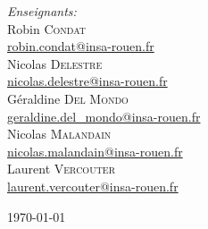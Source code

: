 \documentclass[a4paper, 12pt]{report}
\begin{document}
\begin{titlepage}
\begin{center}
\begin{minipage}{0.4\textwidth}
			\begin{flushright} \large
				\emph{Enseignants:} \\
				Robin \textsc{Condat} \\
				{\small\href{mailto:robin.condat@insa-rouen.fr}{robin.condat@insa-rouen.fr}}
				\\
				Nicolas \textsc{Delestre} \\
				{\small\href{mailto:nicolas.delestre@insa-rouen.fr}{nicolas.delestre@insa-rouen.fr}}
				\\
        		Géraldine \textsc{Del Mondo} \\
				{\small\href{mailto:geraldine.del\_mondo@insa-rouen.fr}{geraldine.del\_mondo@insa-rouen.fr}}
				\\
				Nicolas \textsc{Malandain} \\
				{\small\href{mailto:nicolas.malandain@insa-rouen.fr}{nicolas.malandain@insa-rouen.fr}}
				\\
				Laurent \textsc{Vercouter} \\
				{\small\href{mailto:laurent.vercouter@insa-rouen.fr}{laurent.vercouter@insa-rouen.fr}}
				\\
			\end{flushright}
		\end{minipage}
		\vfill
		{\large \today}
	\end{center}
\end{titlepage}

\begingroup
\titleformat{\part}[display]
    {\normalfont \bfseries\centering}{}{0pt}{\Huge}
\titlespacing*{\part}{0pt}{50pt}{90pt}
\endgroup

\begingroup
\titleformat{\chapter}[display]
    {\normalfont \bfseries\centering}{}{0pt}{\Huge}
\titlespacing*{\chapter}{0pt}{50pt}{90pt}
\endgroup
\end{document}
